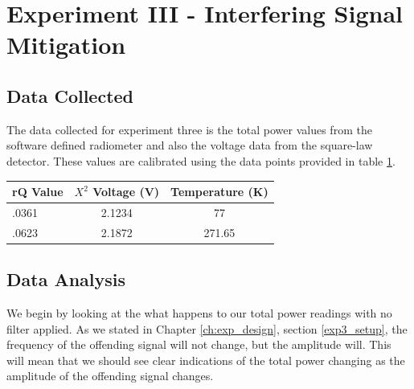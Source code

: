 {%


\section{Experiment III - Interfering Signal Mitigation} \label{Exp3_results}

\subsection{Data Collected}

The data collected for experiment three is the total power values from the software defined radiometer and also the voltage data from the square-law detector.  These values are calibrated using the data points provided in table \ref{exp3_datapoints}.

\begin{table}[h!tb] \centering
{}
\label{exp3_datapoints}
\begin{tabular}{lcc} \hline
\textbf{rQ Value} & \textbf{$X^2$ Voltage (V)} & \textbf{Temperature (K)} \\ \hline
.0361 & 2.1234 & 77 \\
.0623 & 2.1872 & 271.65 \\ \hline
\end{tabular}
\end{table}

\subsection{Data Analysis}

We begin by looking at the what happens to our total power readings with no filter applied.  As we stated in Chapter \ref{ch:exp_design}, section \ref{exp3_setup}, the frequency of the offending signal will not change, but the amplitude will.  This will mean that we should see clear indications of the total power changing as the amplitude of the offending signal changes.  

}

